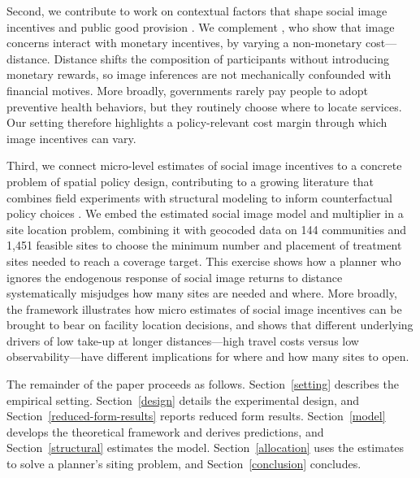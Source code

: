 \documentclass[12pt,a4paper]{article}
\begin{document}
Second, we contribute to work on contextual factors that shape social image incentives and public good provision \citep{kessler_announcements_2017,perez-truglia_partisan_2017,karing}. We complement \citet{ariely2009}, who show that image concerns interact with monetary incentives, by varying a non-monetary cost---distance. Distance shifts the composition of participants without introducing monetary rewards, so image inferences are not mechanically confounded with financial motives. More broadly, governments rarely pay people to adopt preventive health behaviors, but they routinely choose where to locate services. Our setting therefore highlights a policy-relevant cost margin through which image incentives can vary.

Third, we connect micro-level estimates of social image incentives to a concrete problem of spatial policy design, contributing to a growing literature that combines field experiments with structural modeling to inform counterfactual policy choices \citep{ToddWolpin,KaboskiTownsend,DufloHannaRyan,LagakosMobarakWaugh}. We embed the estimated social image model and multiplier in a site location problem, combining it with geocoded data on 144 communities and 1{,}451 feasible sites to choose the minimum number and placement of treatment sites needed to reach a coverage target. This exercise shows how a planner who ignores the endogenous response of social image returns to distance systematically misjudges how many sites are needed and where. More broadly, the framework illustrates how micro estimates of social image incentives can be brought to bear on facility location decisions, and shows that different underlying drivers of low take-up at longer distances---high travel costs versus low observability---have different implications for where and how many sites to open.

The remainder of the paper proceeds as follows. Section~\ref{setting} describes the empirical setting. Section~\ref{design} details the experimental design, and Section~\ref{reduced-form-results} reports reduced form results. Section~\ref{model} develops the theoretical framework and derives predictions, and Section~\ref{structural} estimates the model. Section~\ref{allocation} uses the estimates to solve a planner’s siting problem, and Section~\ref{conclusion} concludes.

\end{document}
